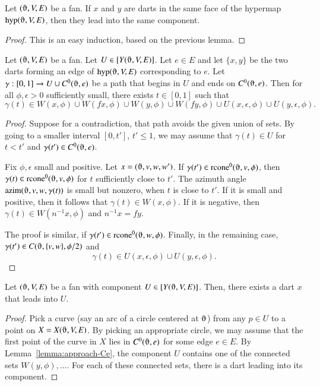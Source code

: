 \begin{lemma}\label{lemma:face-component} 
Let $(\orgn,V,E)$ be a fan.
If $x$ and $y$ are darts in the same face of the hypermap
$\op{hyp}(\orgn,V,E)$, then they lead into the same component.
\end{lemma}

\begin{proof}  This is an easy induction, based on the previous
lemma.  
\end{proof}


\begin{lemma}\label{lemma:approach-Ce}
Let $(\orgn,V,E)$ be a fan.  Let $U\in\comp{Y(\orgn,V,E)}$.  
Let $e\in E$ and let $\{x,y\}$
be the two darts forming an edge of $\op{hyp}(\orgn,V,E)$
corresponding to $e$.  Let $\gamma:[0,1]\to U\cup C^0(\orgn,e)$
be a path that begins in $U$ and ends on $C^0(\orgn,e)$.
Then for all $\phi,\epsilon>0$ sufficiently small,
there exists  $t\in[0,1]$ such that
  $$\gamma(t)\in 
  W(x,\phi) \cup 
  W(f x,\phi)\cup 
  W(y,\phi)\cup 
  W(f y,\phi) 
  \cup U(x,\epsilon,\phi)
  \cup U(y,\epsilon,\phi).
  $$
\end{lemma}

\begin{proof}
Suppose for a contradiction, that path avoids the given union
of sets.  By going to a smaller interval $[0,t']$, $t'\le 1$,
we may assume that $\gamma(t)\in U$ for $t < t'$ and $\gamma(t')\in
C^0(\orgn,e)$.  

Fix $\phi,\epsilon$ small and positive.
Let $x = (\orgn,v,w,w')$.
If $\gamma(t')\in \op{rcone}^0(\orgn,v,\phi)$, then $\gamma(t)\in
\op{rcone}^0(\orgn,v,\phi)$ for $t$ sufficiently close to $t'$.  The
azimuth angle $\op{azim}(\orgn,v,w,\gamma(t))$ is small but nonzero, 
when
$t$ is close to $t'$.  If it is small and positive, then 
it follows that $\gamma(t)\in W(x,\phi)$.  If it is negative, then
$\gamma(t)\in W(n^{-1} x,\phi)$ and $n^{-1} x = f y$.

The proof is similar, if $\gamma(t')\in \op{rcone}^0(\orgn,w,\phi)$.
Finally, in the remaining case, 
$\gamma(t')\in C(\orgn,\{v,w\},\phi/2)$ and 
$$\gamma(t)\in U(x,\epsilon,\phi)\cup U(y,\epsilon,\phi).$$
\end{proof}

\begin{lemma}
Let $(\orgn,V,E)$ be a fan with component $U\in\comp{Y(\orgn,V,E)}$.
Then, there exists a
dart $x$ that leads into $U$.
\end{lemma}

\begin{proof}  Pick a curve (say an arc of a
circle centered at $\orgn$) from any $p\in U$ to a point on $X=X(\orgn,V,E)$.
By picking an appropriate circle, 
we may assume that the first point of the curve in $X$ lies
in $C^0(\orgn,e)$ for some edge $e\in E$.  
By Lemma~\ref{lemma:approach-Ce},
the component $U$ contains one of the connected
sets $W(y,\phi),\ldots$.
For each of these connected sets, there is a dart leading
into its component.
\end{proof}

